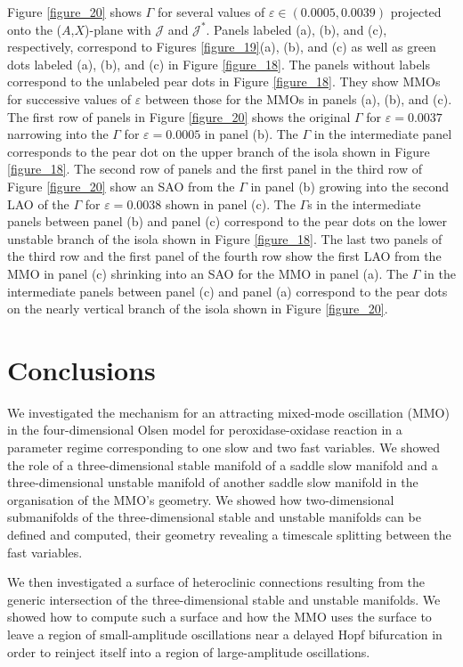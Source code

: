 \documentclass{ws-ijbc}
\begin{document}
Figure \ref{figure_20} shows $\Gamma$ for several values of $\varepsilon \in (0.0005, 0.0039)$ projected onto the ($A$,$X$)-plane with $\mathscr{J}$ and $\mathscr{J}^*$.  Panels labeled (a), (b), and (c), respectively, correspond to  Figures \ref{figure_19}(a), (b), and (c) as well as green dots labeled (a), (b), and (c) in Figure \ref{figure_18}.  The panels without labels correspond to the unlabeled pear dots in Figure \ref{figure_18}.  They show MMOs for successive values of $\varepsilon$ between those for the MMOs in panels (a), (b), and (c).  The first row of panels in Figure \ref{figure_20} shows the original $\Gamma$ for $\varepsilon=0.0037$ narrowing into the $\Gamma$ for $\varepsilon=0.0005$ in panel (b).  The $\Gamma$ in the intermediate panel corresponds to the pear dot on the upper branch of the isola shown in Figure \ref{figure_18}.  The second row of panels and the first panel in the third row of Figure \ref{figure_20} show an SAO from the $\Gamma$ in panel (b) growing into the second LAO of the $\Gamma$ for $\varepsilon=0.0038$ shown in panel (c).  The $\Gamma$s in the intermediate panels between panel (b) and panel (c) correspond to the pear dots on the lower unstable branch of the isola shown in Figure \ref{figure_18}.  The last two panels of the third row and the first panel of the fourth row show the first LAO from the MMO in panel (c) shrinking into an SAO for the MMO in panel (a).  The $\Gamma$ in the intermediate panels between panel (c) and panel (a) correspond to the pear dots on the nearly vertical branch of the isola shown in Figure \ref{figure_20}.

\section{Conclusions}

We investigated the mechanism for an attracting mixed-mode oscillation (MMO) in the four-dimensional Olsen model for peroxidase-oxidase reaction in a parameter regime corresponding to one slow and two fast variables.  We showed the role of a three-dimensional stable manifold of a saddle slow manifold and a three-dimensional unstable manifold of another saddle slow manifold in the organisation of the MMO's geometry.  We showed how two-dimensional submanifolds of the three-dimensional stable and unstable manifolds can be defined and computed, their geometry revealing a timescale splitting between the fast variables.

We then investigated a surface of heteroclinic connections resulting from the generic intersection of the three-dimensional stable and unstable manifolds.  We showed how to compute such a surface and how the MMO uses the surface to leave a region of small-amplitude oscillations near a delayed Hopf bifurcation in order to reinject itself into a region of large-amplitude oscillations.
\end{document}
